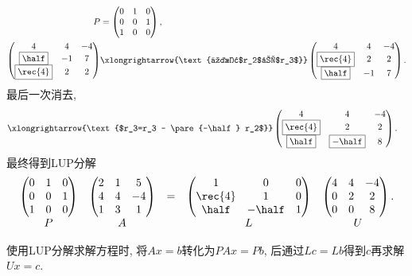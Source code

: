 \documentclass[20pt]{extarticle}
\begin{document}
\begin{ex}
\begin{align*}
        P &= \begin{pmatrix}
            0 & 1 & 0 \\ 0 & 0 & 1 \\ 1 & 0 & 0
        \end{pmatrix}, \\
        \begin{pmatrix}
            4 & 4 & -4 \\ \boxed{\half} & -1 & 7 \\ \boxed{\rec{4}} & 2 & 2
        \end{pmatrix} &\xlongrightarrow{\text{交换$r_2$和$r_3$}} \begin{pmatrix}
            4 & 4 & -4 \\ \boxed{\rec{4}} & 2 & 2 \\ \boxed{\half} & -1 & 7 
        \end{pmatrix}.
    \end{align*}
    最后一次消去,
    \begin{align*}
        & \xlongrightarrow{\text{$r_3=r_3 - \pare{-\half} r_2$}} \begin{pmatrix}
            4 & 4 & -4 \\ \boxed{\rec{4}} & 2 & 2 \\ \boxed{\half} & \boxed{-\half} & 8
        \end{pmatrix}.
    \end{align*}
    最终得到LUP分解
    \[ \begin{array}{ccccc}
        \begin{pmatrix}
            0 & 1 & 0 \\ 0 & 0 & 1 \\ 1 & 0 & 0
        \end{pmatrix}&\begin{pmatrix}
            2 & 1 & 5 \\ 4 & 4 & -4 \\ 1 & 3 & 1
        \end{pmatrix} &=& \begin{pmatrix}
            1 & 0 & 0 \\ \rec{4} & 1 & 0 \\ \half & -\half & 1 \\
        \end{pmatrix} & \begin{pmatrix}
            4 & 4 & -4 \\ 0 & 2 & 2 \\ 0 & 0 & 8
        \end{pmatrix}. \\
        P & A & & L & U
    \end{array} \]
\end{ex}
使用LUP分解求解方程时, 将$Ax=b$转化为$PAx=Pb$, 后通过$Lc=Lb$得到$c$再求解$Ux=c$.
\end{document}
